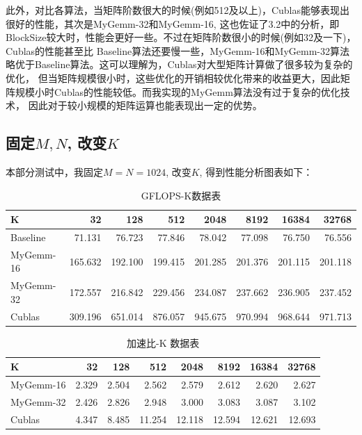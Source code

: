 \documentclass[UTF8]{article}
\begin{document}
此外，对比各算法，当矩阵阶数很大的时候(例如512及以上)，Cublas能够表现出很好的性能，其次是MyGemm-32和MyGemm-16,
这也佐证了3.2中的分析，即BlockSize较大时，性能会更好一些。不过在矩阵阶数很小的时候(例如32及一下)，Cublas的性能甚至比
Baseline算法还要慢一些，MyGemm-16和MyGemm-32算法略优于Baseline算法。这可以理解为，Cublas对大型矩阵计算做了很多较为复杂的优化，
但当矩阵规模很小时，这些优化的开销相较优化带来的收益更大，因此矩阵规模小时Cublas的性能较低。而我实现的MyGemm算法没有过于复杂的优化技术，
因此对于较小规模的矩阵运算也能表现出一定的优势。

\subsection{固定$M, N$, 改变$K$}
本部分测试中，我固定$M=N=1024$, 改变$K$, 得到性能分析图表如下：
\begin{table}[h]
    \caption{GFLOPS-K数据表}
    \label{tab:my-table}
    \centering

    \begin{tabular}{|l|r|r|r|r|r|r|r|}
    \hline
    K         & 32      & 128     & 512     & 2048    & 8192    & 16384   & 32768   \\ \hline
    Baseline  & 71.131  & 76.723  & 77.846  & 78.042  & 77.098  & 76.750  & 76.556  \\ \hline
    MyGemm-16 & 165.632 & 192.100 & 199.415 & 201.285 & 201.376 & 201.115 & 201.118 \\ \hline
    MyGemm-32 & 172.557 & 216.842 & 229.456 & 234.087 & 237.662 & 236.905 & 237.452 \\ \hline
    Cublas    & 309.196 & 651.014 & 876.057 & 945.675 & 970.994 & 968.644 & 971.713 \\ \hline
    \end{tabular}
    \end{table}
    \begin{table}[h]
        \caption{加速比-K 数据表}
    \centering

        \label{tab:my-table}
        \begin{tabular}{|l|r|r|r|r|r|r|r|}
        \hline
        K         & 32       & 128      & 512     & 2048     & 8192     & 16384    & 32768   \\ \hline
        MyGemm-16 & 2.329 & 2.504 & 2.562 & 2.579 & 2.612 & 2.620 & 2.627 \\ \hline
        MyGemm-32 & 2.426    & 2.826    & 2.948   & 3.000    & 3.083    & 3.087    & 3.102   \\ \hline
        Cublas    & 4.347    & 8.485    & 11.254  & 12.118   & 12.594   & 12.621   & 12.693  \\ \hline
        \end{tabular}
        \end{table}
\end{document}
